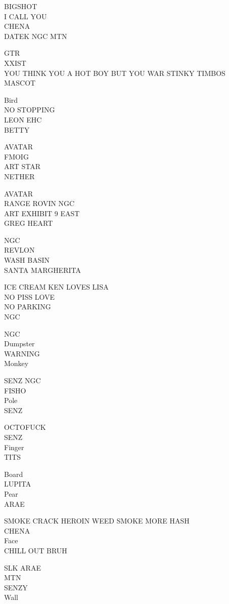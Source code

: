\documentclass[10pt,letterpaper]{article}
\begin{document}
BIGSHOT\\
I CALL YOU\\
CHENA\\
DATEK NGC MTN

GTR\\
XXIST\\
YOU THINK YOU A HOT BOY BUT YOU WAR STINKY TIMBOS\\
MASCOT

Bird\\
NO STOPPING\\
LEON EHC\\
BETTY

AVATAR\\
FMOIG\\
ART STAR\\
NETHER

AVATAR\\
RANGE ROVIN NGC\\
ART EXHIBIT 9 EAST\\
GREG HEART

NGC\\
REVLON\\
WASH BASIN\\
SANTA MARGHERITA

ICE CREAM KEN LOVES LISA\\
NO PISS LOVE\\
NO PARKING\\
NGC

NGC\\
Dumpster\\
WARNING\\
Monkey

SENZ NGC\\
FISHO\\
Pole\\
SENZ

OCTOFUCK\\
SENZ\\
Finger\\
TITS

Board\\
LUPITA\\
Pear\\
ARAE

SMOKE CRACK HEROIN WEED SMOKE MORE HASH\\
CHENA\\
Face\\
CHILL OUT BRUH

SLK ARAE\\
MTN\\
SENZY\\
Wall
\end{document}
